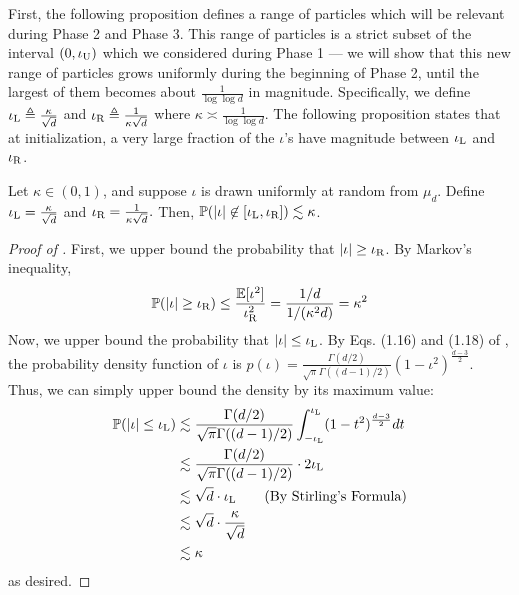 First, the following proposition defines a range of particles which will be relevant during Phase 2 and Phase 3. This range of particles is a strict subset of the interval $(0, \iota_{\textup{U}})$ which we considered during Phase 1 --- we will show that this new range of particles grows uniformly during the beginning of Phase 2, until the largest of them becomes about $\frac{1}{\log \log d}$ in magnitude. Specifically, we define $\iota_{\textup{L}} \triangleq \frac{\kappa}{\sqrt{d}}$ and $\iota_{\textup{R}} \triangleq \frac{1}{\kappa \sqrt{d}}$ where $\kappa \asymp \frac{1}{\log \log d}$. The following proposition states that at initialization, a very large fraction of the $\iota$'s have magnitude between $\iota_{\textup{L}}$ and $\iota_{\textup{R}}$.

\begin{proposition} \label{prop:probability_of_relevant_interval}
Let $\kappa \in (0, 1)$, and suppose $\iota$ is drawn uniformly at random from $\mu_d$. Define $\iota_{\textup{L}} = \frac{\kappa}{\sqrt{d}}$ and $\iota_{\textup{R}} = \frac{1}{\kappa \sqrt{d}}.$ Then, $\mathbb{P}(|\iota| \not\in [\iota_{\textup{L}}, \iota_{\textup{R}}]) \lesssim \kappa$.
\end{proposition}

\begin{proof}[Proof of ]
First, we upper bound the probability that $|\iota| \geq \iota_{\textup{R}}$. By Markov's inequality,
\begin{align}
\mathbb{P}(|\iota| \geq \iota_{\textup{R}}) \leq \frac{\operatorname*{\mathbb{E}}[\iota^2]}{\iota_{\textup{R}}^2} = \frac{1/d}{1/(\kappa^2 d)} = \kappa^2
\end{align}
Now, we upper bound the probability that $|\iota| \leq \iota_{\textup{L}}$. By Eqs. (1.16) and (1.18) of \citet{atkinson2012spherical}, the probability density function of $\iota$ is $p(\iota) = \frac{\Gamma(d/2)}{\sqrt{\pi} \Gamma((d - 1)/2)} (1 - \iota^2)^{\frac{d - 3}{2}}$. Thus, we can simply upper bound the density by its maximum value:
\begin{align}
\mathbb{P}(|\iota| \leq \iota_{\textup{L}})
& \lesssim \frac{\Gamma(d/2)}{\sqrt{\pi} \Gamma((d - 1)/2)} \int_{-\iota_{\textup{L}}}^{\iota_{\textup{L}}} (1 - t^2)^{\frac{d - 3}{2}} dt \\
& \lesssim \frac{\Gamma(d/2)}{\sqrt{\pi} \Gamma((d - 1)/2)} \cdot 2\iota_{\textup{L}} \\
& \lesssim \sqrt{d} \cdot \iota_{\textup{L}}
\tag{By Stirling's Formula} \\
& \lesssim \sqrt{d} \cdot \frac{\kappa}{\sqrt{d}} \\
& \lesssim \kappa
\end{align}
as desired.
\end{proof}

